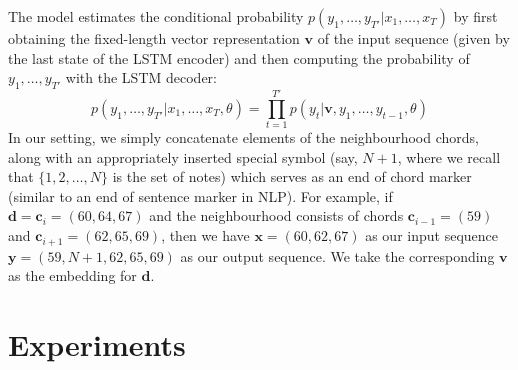 \documentclass{article}
\newcommand{\N}{\mathcal{N}}
\newcommand{\T}{\mathcal{T}}
\newcommand{\boldc}{\boldsymbol c}
\newcommand{\boldd}{\boldsymbol d}
\newcommand{\boldy}{\boldsymbol y}
\newcommand{\boldx}{\boldsymbol x}
\begin{document}
The model estimates the conditional probability $p(y_1,\ldots,y_{T'} | x_1, \ldots, x_T)$ by first obtaining the fixed-length vector representation $\boldsymbol{v}$ of the input sequence (given by the last state of the LSTM encoder) and then computing the probability of $y_1,\ldots,y_{T'} $ with the LSTM decoder: 
%
\begin{equation}
p(y_1,\ldots,y_{T'} | x_1, \ldots, x_T,\theta) = \prod_{t=1}^{T'} p(y_t|\boldsymbol{v}, y_1,\ldots,y_{t-1},\theta)
\end{equation}
%
%
In our setting, we simply concatenate elements of the neighbourhood chords, along with an appropriately inserted special symbol (say, $N+1$, where we recall that $\{1,2,\dots,N\}$ is the set of notes) which serves as an end of chord marker (similar to an end of sentence marker in NLP). For example, if $\boldd=\boldc_i=(60,64,67)$ and the neighbourhood consists of chords $\boldc_{i-1}=(59)$ and $\boldc_{i+1}=(62,65,69)$, then we have $\boldx=(60,62,67)$ as our input sequence $\boldy=(59,N+1,62,65,69)$ as our output sequence. We take the corresponding $\boldsymbol{v}$ as the embedding for $\boldd$.
%
%
%
%
\section{Experiments}
\label{sec:experiments}
\end{document}
